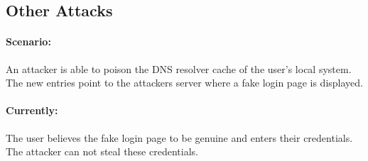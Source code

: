 





\subsection{Other Attacks}

\paragraph{Scenario:} An attacker is able to poison the DNS resolver cache of the user's local system. The new entries point to the attackers server where a fake login page is displayed.

\paragraph{Currently:} The user believes the fake login page to be genuine and enters their credentials. The attacker can not steal these credentials.

